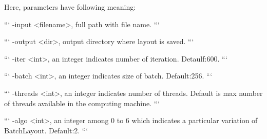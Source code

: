 \documentclass[conference]{article}
\begin{document}
Here, parameters have following meaning: 
\newline
\begin{markdown}
```
-input <filename>, full path with file name.
```
\end{markdown}
\newline
\begin{markdown}
```
-output <dir>, output directory where layout is saved.
```
\end{markdown}
\newline
\begin{markdown}
```
-iter <int>, an integer indicates number of iteration. Detaulf:600.
```
\end{markdown}
\newline
\begin{markdown}
```
-batch <int>, an integer indicates size of batch. Default:256.
```
\end{markdown}
\newline
\begin{markdown}
```
-threads <int>, an integer indicates number of threads. Default is max number of threads available in the computing machine.
```
\end{markdown}
\newline
\begin{markdown}
```
-algo <int>, an integer among 0 to 6 which indicates a particular variation of BatchLayout. Default:2. 
```
\end{markdown}
\end{document}
